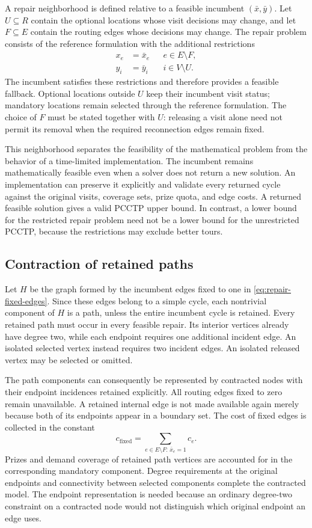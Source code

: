 A repair neighborhood is defined relative to a feasible incumbent
$(\bar x,\bar y)$. Let $U\subseteq R$ contain the optional locations whose
visit decisions may change, and let $F\subseteq E$ contain the routing edges
whose decisions may change. The repair problem consists of the reference
formulation with the additional restrictions
\begin{align}
 x_e&=\bar x_e &&e\in E\setminus F,\label{eq:repair-fixed-edges}\\
 y_i&=\bar y_i &&i\in V\setminus U.\label{eq:repair-fixed-visits}
\end{align}
The incumbent satisfies these restrictions and therefore provides a feasible
fallback. Optional locations outside $U$ keep their incumbent visit status;
mandatory locations remain selected through the reference formulation.
The choice of $F$ must be stated together with $U$: releasing a visit alone
need not permit its removal when the required reconnection edges remain fixed.

This neighborhood separates the feasibility of the mathematical problem from
the behavior of a time-limited implementation. The incumbent remains
mathematically feasible even when a solver does not return a new solution.
An implementation can preserve it explicitly and validate every returned cycle
against the original visits, coverage sets, prize quota, and edge costs.
A returned feasible solution gives a valid PCCTP upper bound. In contrast,
a lower bound for the restricted repair problem need not be a lower bound
for the unrestricted PCCTP, because the restrictions may exclude better tours.

\subsection{Contraction of retained paths}
Let $H$ be the graph formed by the incumbent edges fixed to one in
\eqref{eq:repair-fixed-edges}. Since these edges belong to a simple cycle,
each nontrivial component of $H$ is a path, unless the entire incumbent cycle
is retained. Every retained path must occur in every feasible repair. Its
interior vertices already have degree two, while each endpoint requires one
additional incident edge. An isolated selected vertex instead requires two
incident edges. An isolated released vertex may be selected or omitted.

The path components can consequently be represented by contracted nodes with
their endpoint incidences retained explicitly. All routing edges fixed to zero
remain unavailable. A retained internal edge is not made available again merely
because both of its endpoints appear in a boundary set. The cost of fixed
edges is collected in the constant
\begin{equation}
 c_{\mathrm{fixed}}=\sum_{e\in E\setminus F:\,\bar x_e=1}c_e.
\end{equation}
Prizes and demand coverage of retained path vertices are accounted for in the
corresponding mandatory component. Degree requirements at the original endpoints
and connectivity between selected components complete the contracted model.
The endpoint representation is needed because an ordinary degree-two constraint
on a contracted node would not distinguish which original endpoint an edge uses.

